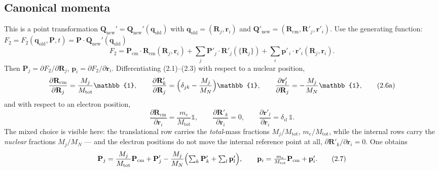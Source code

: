 \subsection{Canonical momenta}

This is a point transformation $\mathbf{Q}_{\mathrm{new}}' = \mathbf{Q}_{\mathrm{new}}'(\mathbf{q}_{\mathrm{old}})$ with $\mathbf{q}_{\mathrm{old}} = (\mathbf{R}_j,\mathbf{r}_i)$ and $\mathbf{Q}'_{\mathrm{new}} = (\mathbf{R}_{\mathrm{cm}},\mathbf{R}'_j,\mathbf{r}'_i)$. Use the generating function:
$F_2 = F_2(\mathbf{q_{\mathrm{old}}}, \mathbf{P}, t) = \mathbf{P} \cdot \mathbf{Q}_{\mathrm{new}}'(\mathbf{q_{\mathrm{old}}})$
\begin{equation}
F_2 = \mathbf{P}_{\mathrm{cm}}\cdot\mathbf{R}_{\mathrm{cm}}(\mathbf{R}_j,\mathbf{r}_i) + \sum_j\mathbf{P}'_j\cdot\mathbf{R}'_j(\{\mathbf{R}_j\}) + \sum_i\mathbf{p}'_{\,i}\cdot\mathbf{r}'_i(\mathbf{R}_j,\mathbf{r}_i). \tag{2.5}
\end{equation}
Then $\mathbf{P}_j = \partial F_2/\partial\mathbf{R}_j$, $\mathbf{p}_i = \partial F_2/\partial\mathbf{r}_i$. Differentiating (2.1)--(2.3) with respect to a nuclear position,
\begin{equation}
\frac{\partial\mathbf{R}_{\mathrm{cm}}}{\partial\mathbf{R}_j} = \frac{M_j}{M_{\mathrm{tot}}}\mathbb{1},\qquad \frac{\partial\mathbf{R}'_k}{\partial\mathbf{R}_j} = \Bigl(\delta_{jk}-\frac{M_j}{M_N}\Bigr)\mathbb{1},\qquad \frac{\partial\mathbf{r}'_l}{\partial\mathbf{R}_j} = -\frac{M_j}{M_N}\mathbb{1}, \tag{2.6a}
\end{equation}
and with respect to an electron position,
\begin{equation}
\frac{\partial\mathbf{R}_{\mathrm{cm}}}{\partial\mathbf{r}_i} = \frac{m_e}{M_{\mathrm{tot}}}\mathbb{1},\qquad \frac{\partial\mathbf{R}'_k}{\partial\mathbf{r}_i} = 0,\qquad \frac{\partial\mathbf{r}'_l}{\partial\mathbf{r}_i} = \delta_{il}\,\mathbb{1}. \tag{2.6b}
\end{equation}
The mixed choice is visible here: the translational row carries the \emph{total}-mass fractions $M_j/M_{\mathrm{tot}}$, $m_e/M_{\mathrm{tot}}$, while the internal rows carry the \emph{nuclear} fractions $M_j/M_N$ --- and the electron positions do not move the internal reference point at all, $\partial\mathbf{R}'_k/\partial\mathbf{r}_i=0$. One obtains
\begin{equation}
\mathbf{P}_j = \frac{M_j}{M_{\mathrm{tot}}}\mathbf{P}_{\mathrm{cm}} + \mathbf{P}'_j - \frac{M_j}{M_N}\Bigl(\textstyle\sum_k\mathbf{P}'_k+\sum_l\mathbf{p}'_l\Bigr),\qquad
\mathbf{p}_i = \frac{m_e}{M_{\mathrm{tot}}}\mathbf{P}_{\mathrm{cm}} + \mathbf{p}'_i. \tag{2.7}
\end{equation}
